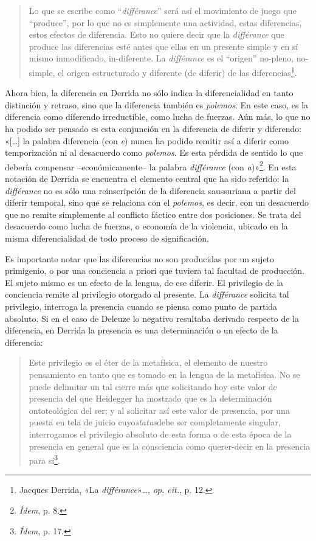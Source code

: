 \begin{quote}
Lo que se escribe como ``\emph{différance}'' será así el movimiento de juego que ``produce'', por lo que no es simplemente una actividad, estas diferencias, estos efectos de diferencia. Esto no quiere decir que la \emph{différance} que produce las diferencias esté antes que ellas en un presente simple y en sí mismo inmodificado, in-diferente. La \emph{différance} es el ``origen'' no-pleno, no-simple, el origen estructurado y diferente (de diferir) de las diferencias\footnote{Jacques Derrida, «La \emph{différance}»\ldots, \emph{op. cit.}, p. 12.}.
\end{quote}

Ahora bien, la diferencia en Derrida no sólo indica la diferencialidad en tanto distinción y retraso, sino que la diferencia también es \emph{polemos}. En este caso, es la diferencia como diferendo irreductible, como lucha de fuerzas. Aún más, lo que no ha podido ser pensado es esta conjunción en la diferencia de diferir y diferendo: «{[}\ldots{]} la palabra diferencia (con \emph{e}) nunca ha podido remitir así a diferir como temporización ni al desacuerdo como \emph{polemos}. Es esta pérdida de sentido lo que debería compensar --económicamente-- la palabra \emph{différance} (con \emph{a})»\footnote{\emph{Ídem}, p. 8.}. En esta notación de Derrida se encuentra el elemento central que ha sido referido: la \emph{différance} no es sólo una reinscripción de la diferencia saussuriana a partir del diferir temporal, sino que se relaciona con el \emph{polemos}, es decir, con un desacuerdo que no remite simplemente al conflicto fáctico entre dos posiciones. Se trata del desacuerdo como lucha de fuerzas, o economía de la violencia, ubicado en la misma diferencialidad de todo proceso de significación.

Es importante notar que las diferencias no son producidas por un sujeto primigenio, o por una conciencia a priori que tuviera tal facultad de producción. El sujeto mismo es un efecto de la lengua, de ese diferir. El privilegio de la conciencia remite al privilegio otorgado al presente. La \emph{différance} solicita tal privilegio, interroga la presencia cuando se piensa como punto de partida absoluto. Si en el caso de Deleuze lo negativo resultaba derivado respecto de la diferencia, en Derrida la presencia es una determinación o un efecto de la diferencia:

\begin{quote}
Este privilegio es el éter de la metafísica, el elemento de nuestro pensamiento en tanto que es tomado en la lengua de la metafísica. No se puede delimitar un tal cierre más que solicitando hoy este valor de presencia del que Heidegger ha mostrado que es la determinación ontoteológica del ser; y al solicitar así este valor de presencia, por una puesta en tela de juicio cuyo\emph{status}debe ser completamente singular, interrogamos el privilegio absoluto de esta forma o de esta época de la presencia en general que es la consciencia como querer-decir en la presencia para sí\footnote{\emph{Ídem}, p. 17.}.
\end{quote}

